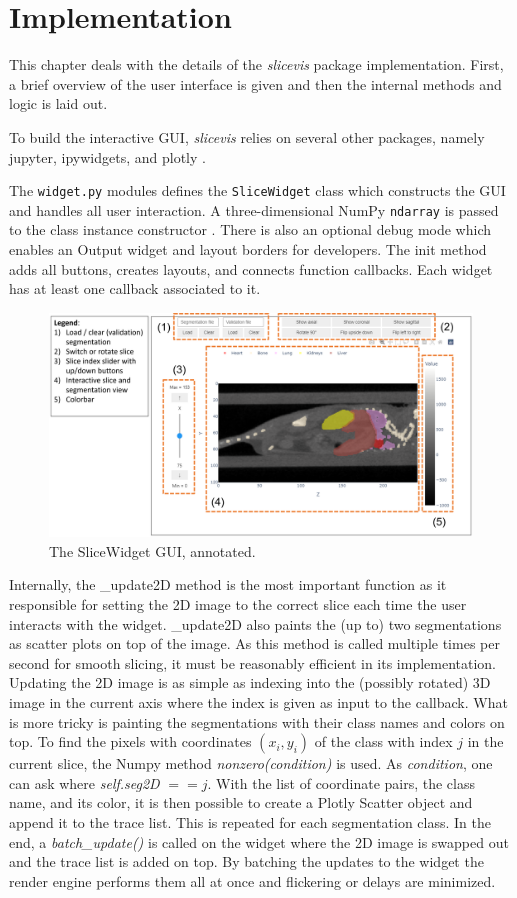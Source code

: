 \chapter{Implementation}
This chapter deals with the details of the \emph{slicevis} package implementation. First, a brief overview of the user interface is given and then the internal methods and logic is laid out.

To build the interactive GUI, \emph{slicevis} relies on several other packages, namely jupyter, ipywidgets, and plotly .  

The \texttt{widget.py} modules defines the \texttt{SliceWidget} class which constructs the GUI and handles all user interaction. A three-dimensional NumPy \texttt{ndarray} is passed to the class instance constructor \cite{ndarray}. There is also an optional debug mode which enables an Output widget  and layout borders for developers. The init method adds all buttons, creates layouts, and connects function callbacks. Each widget has at least one callback associated to it.

\begin{figure}[h]
	\centering
	\includegraphics[width=.9\linewidth]{figures/GUI.png}
	\caption{The SliceWidget GUI, annotated.}
\end{figure}

Internally, the \_update2D method is the most important function as it responsible for setting the 2D image to the correct slice each time the user interacts with the widget. \_update2D also paints the (up to) two segmentations as scatter plots on top of the image. As this method is called multiple times per second for smooth slicing, it must be reasonably efficient in its implementation. Updating the 2D image is as simple as indexing into the (possibly rotated) 3D image in the current axis where the index is given as input to the callback. What is more tricky is painting the segmentations with their class names and colors on top. To find the pixels with coordinates $(x_i , y_i)$ of the class with index $j$ in the current slice, the Numpy method \emph{nonzero(condition)} is used. As \emph{condition}, one can ask where \emph{self.seg2D} $== j$. With the list of coordinate pairs, the class name, and its color, it is then possible to create a Plotly Scatter object and append it to the trace list. This is repeated for each segmentation class. In the end, a \emph{batch\_update()} is called on the widget where the 2D image is swapped out and the trace list is added on top. By batching the updates to the widget the render engine performs them all at once and flickering or delays are minimized. 


